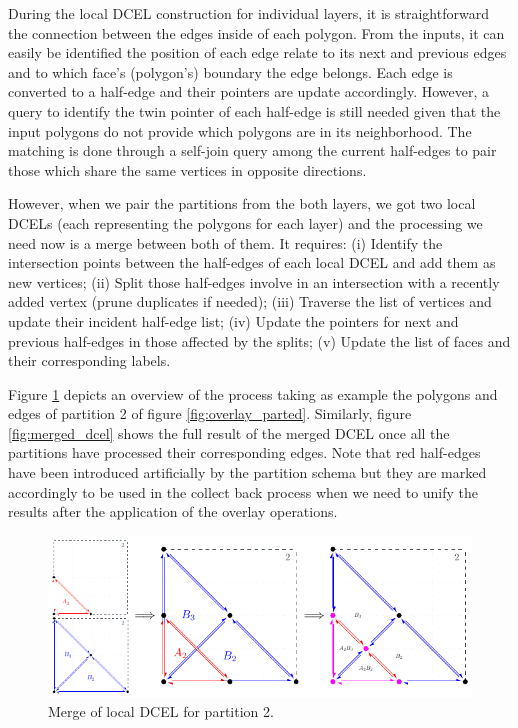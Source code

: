 During the local DCEL construction for individual layers, it is straightforward the connection between the edges inside of each polygon.  From the inputs, it can easily be identified the position of each edge relate to its next and previous edges and to which face's (polygon's) boundary the edge belongs.  Each edge is converted to a half-edge and their pointers are update accordingly.  However, a query to identify the twin pointer of each half-edge is still needed given that the input polygons do not provide which polygons are in its neighborhood. The matching is done through a self-join query among the current half-edges to pair those which share the same vertices in opposite directions.

However, when we pair the partitions from the both layers, we got two local DCELs (each representing the polygons for each layer) and the processing we need now is a merge between both of them.  It requires: (i) Identify the intersection points between the half-edges of each local DCEL and add them as new vertices; (ii) Split those half-edges involve in an intersection with a recently added vertex (prune duplicates if needed); (iii) Traverse the list of vertices and update their incident half-edge list; (iv) Update the pointers for next and previous half-edges in those affected by the splits; (v) Update the list of faces and their corresponding labels.

Figure \ref{fig:part2} depicts an overview of the process taking as example the polygons and edges of partition 2 of figure \ref{fig:overlay_parted}.  Similarly, figure \ref{fig:merged_dcel} shows the full result of the merged DCEL once all the partitions have processed their corresponding edges. Note that red half-edges have been introduced artificially by the partition schema but they are marked accordingly to be used in the collect back process when we need to unify the results after the application of the overlay operations.

\begin{figure}[!ht]
    \centering
    \includegraphics[width=0.9\linewidth]{figures/02-Part2}
    \caption{Merge of local DCEL for partition 2.}\label{fig:part2}
\end{figure}

